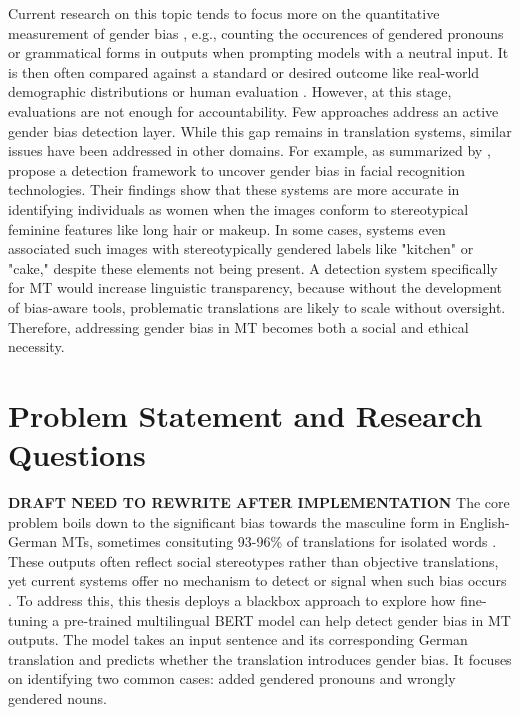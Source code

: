 Current research on this topic tends to focus more on the quantitative measurement of gender bias \citep{rescignoGenderBiasMachine2023,barclayInvestigatingMarkersDrivers2024a,smacchiaDoesAIReflect2024}, e.g., counting the occurences of gendered pronouns or grammatical forms in outputs when prompting models with a neutral input. It is then often compared against a standard or desired outcome like real-world demographic distributions \citep{smacchiaDoesAIReflect2024,pratesAssessingGenderBias2019} or human evaluation \citep{lardelliBuildingBridgesDataset2024,savoldiWhatHarmQuantifying2024}. However, at this stage, evaluations are not enough for accountability. Few approaches address an active gender bias detection layer. While this gap remains in translation systems, similar issues have been addressed in other domains. For example, as summarized by \citet{shresthaExploringGenderBiases2022}, \citet{schwemmerDiagnosingGenderBias2020} propose a detection framework to uncover gender bias in facial recognition technologies. Their findings show that these systems are more accurate in identifying individuals as women when the images conform to stereotypical feminine features like long hair or makeup. In some cases, systems even associated such images with stereotypically gendered labels like "kitchen" or "cake," despite these elements not being present. 
A detection system specifically for MT would increase linguistic transparency, because without the development of bias-aware tools, problematic translations are likely to scale without oversight. Therefore, addressing gender bias in MT becomes both a social and ethical necessity.

\section{Problem Statement and Research Questions}
\textbf{DRAFT NEED TO REWRITE AFTER IMPLEMENTATION}
The core problem boils down to the significant bias towards the masculine form in English-German MTs, sometimes consituting 93-96\% of translations for isolated words \citep{lardelliBuildingBridgesDataset2024}. These outputs often reflect social stereotypes rather than objective translations, yet current systems offer no mechanism to detect or signal when such bias occurs \citep{rescignoGenderBiasMachine2023}. To address this, this thesis deploys a blackbox approach to explore how fine-tuning a pre-trained multilingual BERT model can help detect gender bias in MT outputs. The model takes an input sentence and its corresponding German translation and predicts whether the translation introduces gender bias. It focuses on identifying two common cases: added gendered pronouns and wrongly gendered nouns.

